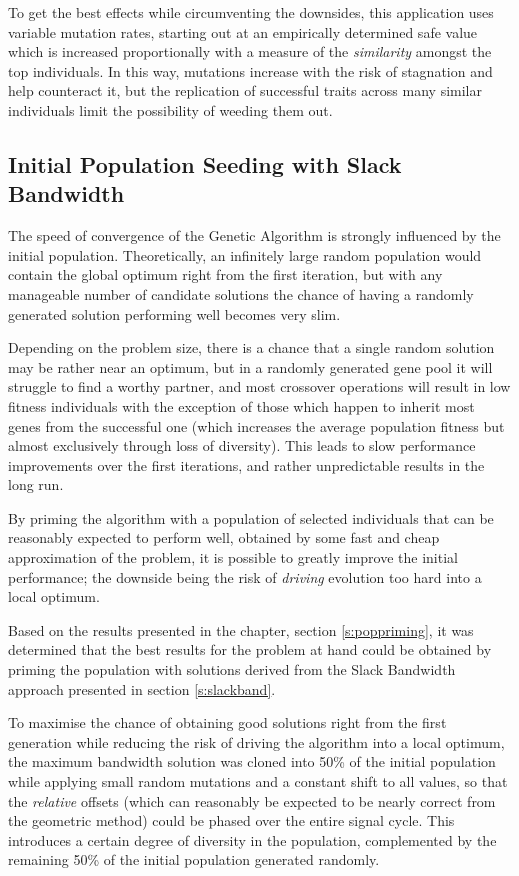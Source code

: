 To get the best effects while circumventing the downsides, this application uses variable mutation rates, starting out at an empirically determined safe value which is increased proportionally with a measure of the \emph{similarity} amongst the top individuals. In this way, mutations increase with the risk of stagnation and help counteract it, but the replication of successful traits across many similar individuals limit the possibility of weeding them out.

\subsection{Initial Population Seeding with Slack Bandwidth} \label{s:seeding}
The speed of convergence of the Genetic Algorithm is strongly influenced by the initial population.
Theoretically, an infinitely large random population would contain the global optimum right from the first iteration, but with any manageable number of candidate solutions the chance of having a randomly generated solution performing well becomes very slim.

Depending on the problem size, there is a chance that a single random solution may be rather near an optimum, but in a randomly generated gene pool it will struggle to find a worthy partner, and most crossover operations will result in low fitness individuals with the exception of those which happen to inherit most genes from the successful one (which increases the average population fitness but almost exclusively through loss of diversity). This leads to slow performance improvements over the first iterations, and rather unpredictable results in the long run.

By priming the algorithm with a population of selected individuals that can be reasonably expected to perform well, obtained by some fast and cheap approximation of the problem, it is possible to greatly improve the initial performance; the downside being the risk of \emph{driving} evolution too hard into a local optimum.

Based on the results presented in the  chapter, section \ref{s:poppriming}, it was determined that the best results for the problem at hand could be obtained by priming the population with solutions derived from the Slack Bandwidth approach presented in section \ref{s:slackband}.

To maximise the chance of obtaining good solutions right from the first generation while reducing the risk of driving the algorithm into a local optimum, the maximum bandwidth solution was cloned into 50\% of the initial population while applying small random mutations and a constant shift to all values, so that the \emph{relative} offsets (which can reasonably be expected to be nearly correct from the geometric method) could be phased over the entire signal cycle. This introduces a certain degree of diversity in the population, complemented by the remaining 50\% of the initial population generated randomly.




